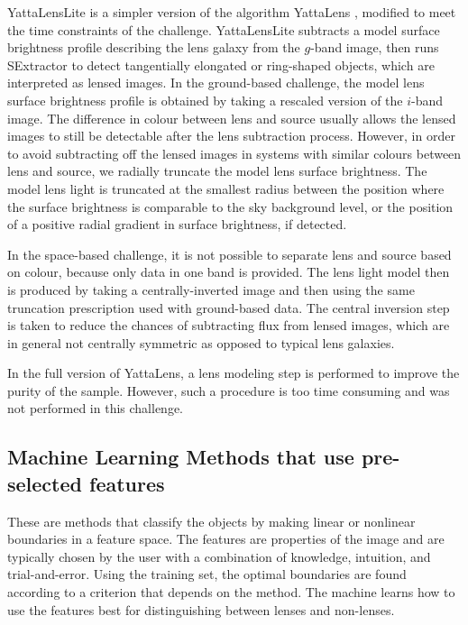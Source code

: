 \documentclass{aa}
\begin{document}
YattaLensLite is a simpler version of the algorithm YattaLens \citep{2017arXiv170401585S}, modified to meet the time constraints of the challenge.
YattaLensLite subtracts a model surface brightness profile describing the lens galaxy from the $g$-band image, then runs SExtractor to detect tangentially elongated or ring-shaped objects, which are interpreted as lensed images.
In the ground-based challenge, the model lens surface brightness profile is obtained by taking a rescaled version of the $i$-band image.
The difference in colour between lens and source usually allows the lensed images to still be detectable after the lens subtraction process.
However, in order to avoid subtracting off the lensed images in systems with similar colours between lens and source, we radially truncate the model lens surface brightness.
The model lens light is truncated at the smallest radius between the position where the surface brightness is comparable to the sky background level, or the position of a positive radial gradient in surface brightness, if detected.

In the space-based challenge, it is not possible to separate lens and source based on colour, because only data in one band is provided. The lens light model then is produced by taking a centrally-inverted image and then using the same truncation prescription used with ground-based data. The central inversion step is taken to reduce the chances of subtracting flux from lensed images, which are in general not centrally symmetric as opposed to typical lens galaxies.

In the full version of YattaLens, a lens modeling step is performed to improve the purity of the sample. However, such a procedure is too time consuming and was not performed in this challenge.

\subsection{Machine Learning Methods that use pre-selected features}

These are methods that classify the objects by making linear or nonlinear boundaries in a feature space.  The features are properties of the image and are typically chosen by the user with a combination of knowledge, intuition, and trial-and-error.  Using the training set, the optimal boundaries are found according to a criterion that depends on the method.  The machine learns how to use the features best for distinguishing between lenses and non-lenses.
\end{document}
